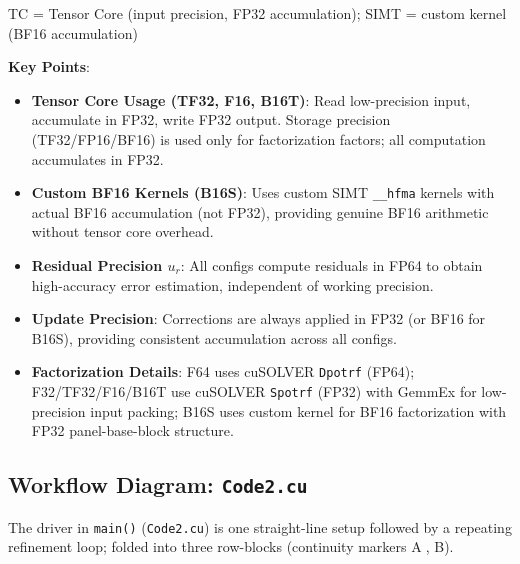 \documentclass[11pt,a4paper]{article}
\begin{document}
\footnotesize TC = Tensor Core (input precision, FP32 accumulation); SIMT = custom kernel (BF16 accumulation)

\normalsize \textbf{Key Points}:
\begin{itemize}
  \item \textbf{Tensor Core Usage (TF32, F16, B16T)}: Read low-precision input, accumulate in FP32, write FP32 output. Storage precision (TF32/FP16/BF16) is used only for factorization factors; all computation accumulates in FP32.
  \item \textbf{Custom BF16 Kernels (B16S)}: Uses custom SIMT \texttt{\_\_hfma} kernels with actual BF16 accumulation (not FP32), providing genuine BF16 arithmetic without tensor core overhead.
  \item \textbf{Residual Precision $u_r$}: All configs compute residuals in FP64 to obtain high-accuracy error estimation, independent of working precision.
  \item \textbf{Update Precision}: Corrections are always applied in FP32 (or BF16 for B16S), providing consistent accumulation across all configs.
  \item \textbf{Factorization Details}: F64 uses cuSOLVER \texttt{Dpotrf} (FP64); F32/TF32/F16/B16T use cuSOLVER \texttt{Spotrf} (FP32) with GemmEx for low-precision input packing; B16S uses custom kernel for BF16 factorization with FP32 panel-base-block structure.
\end{itemize}

\subsection{Workflow Diagram: \texttt{Code2.cu}}
\label{sec:workflow}

The driver in \texttt{main()} (\texttt{Code2.cu}) is one straight-line setup
followed by a repeating refinement loop; folded into three row-blocks
(continuity markers \textcircled{\scriptsize A}, \textcircled{\scriptsize
B}).
\end{document}
